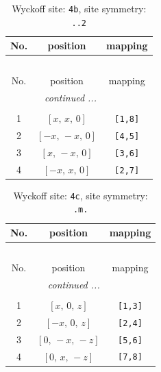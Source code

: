 \documentclass[fleqn,8pt]{jsarticle}
\begin{document}
\begin{longtable}{ccc}
\caption{Wyckoff site: {\tt 4b}, site symmetry: {\tt ..2}}
 \\
 \hline \hline
No. & position & mapping \\ \hline \endfirsthead

\multicolumn{2}{l}{\tablename\ \thetable{}} \\
 \hline \hline
No. & position & mapping \\ \hline \endhead

 \hline \hline
\multicolumn{2}{r}{\footnotesize\it continued ...} \\ \endfoot

 \hline \hline
\multicolumn{2}{r}{} \\ \endlastfoot

1 & $\left[ x,\, x,\, 0 \right]$ & {\tt [1,8]} \\ \hline
2 & $\left[ - x,\, - x,\, 0 \right]$ & {\tt [4,5]} \\ \hline
3 & $\left[ x,\, - x,\, 0 \right]$ & {\tt [3,6]} \\ \hline
4 & $\left[ - x,\, x,\, 0 \right]$ & {\tt [2,7]} \\
\end{longtable}
\renewcommand{\arraystretch}{1.2}
\begin{longtable}{ccc}
\caption{Wyckoff site: {\tt 4c}, site symmetry: {\tt .m.}}
 \\
 \hline \hline
No. & position & mapping \\ \hline \endfirsthead

\multicolumn{2}{l}{\tablename\ \thetable{}} \\
 \hline \hline
No. & position & mapping \\ \hline \endhead

 \hline \hline
\multicolumn{2}{r}{\footnotesize\it continued ...} \\ \endfoot

 \hline \hline
\multicolumn{2}{r}{} \\ \endlastfoot

1 & $\left[ x,\, 0,\, z \right]$ & {\tt [1,3]} \\ \hline
2 & $\left[ - x,\, 0,\, z \right]$ & {\tt [2,4]} \\ \hline
3 & $\left[ 0,\, - x,\, - z \right]$ & {\tt [5,6]} \\ \hline
4 & $\left[ 0,\, x,\, - z \right]$ & {\tt [7,8]} \\
\end{longtable}
\renewcommand{\arraystretch}{1.2}
\end{document}
